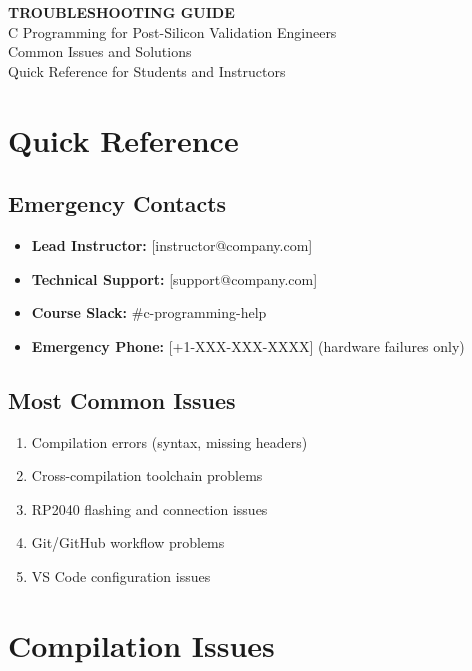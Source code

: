 \documentclass[11pt,a4paper]{article}
\begin{document}
\begin{center}
    {\Huge\bfseries\color{codeblue} TROUBLESHOOTING GUIDE}\\[0.5cm]
    {\Large C Programming for Post-Silicon Validation Engineers}\\[0.3cm]
    {\large Common Issues and Solutions}\\[0.2cm]
    {\normalsize Quick Reference for Students and Instructors}
\end{center}

\vspace{1cm}

\section{Quick Reference}

\subsection{Emergency Contacts}
\begin{itemize}
    \item \textbf{Lead Instructor:} [instructor@company.com]
    \item \textbf{Technical Support:} [support@company.com]
    \item \textbf{Course Slack:} \#c-programming-help
    \item \textbf{Emergency Phone:} [+1-XXX-XXX-XXXX] (hardware failures only)
\end{itemize}

\subsection{Most Common Issues}
\begin{enumerate}
    \item Compilation errors (syntax, missing headers)
    \item Cross-compilation toolchain problems
    \item RP2040 flashing and connection issues
    \item Git/GitHub workflow problems
    \item VS Code configuration issues
\end{enumerate}

\section{Compilation Issues}
\end{document}
